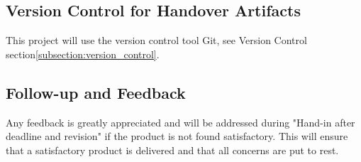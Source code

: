 

\subsection{Version Control for Handover Artifacts}

This project will use the version control tool Git, see Version Control section\:\ref{subsection:version_control}.



\subsection{Follow-up and Feedback}

Any feedback is greatly appreciated and will be addressed during "Hand-in after deadline and revision" if the product is not found satisfactory. This will ensure that a satisfactory product is delivered and that all concerns are put to rest.



